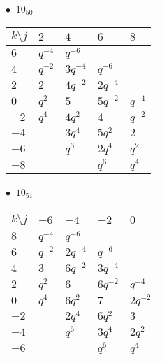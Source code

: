 \begin{minipage}{\linewidth}
$\bullet\ $ $10_{50}$ \vspace{0.5em} \\
\begin{tabular}{l|llll}
$k \setminus j$ & $2$ & $4$ & $6$ & $8$ \\
\hline
$6$ & $q^{-4}$ & $q^{-6}$ &  &  \\
$4$ & $q^{-2}$ & $3q^{-4}$ & $q^{-6}$ &  \\
$2$ & $2$ & $4q^{-2}$ & $2q^{-4}$ &  \\
$0$ & $q^{2}$ & $5$ & $5q^{-2}$ & $q^{-4}$ \\
$-2$ & $q^{4}$ & $4q^{2}$ & $4$ & $q^{-2}$ \\
$-4$ &  & $3q^{4}$ & $5q^{2}$ & $2$ \\
$-6$ &  & $q^{6}$ & $2q^{4}$ & $q^{2}$ \\
$-8$ &  &  & $q^{6}$ & $q^{4}$ \\
\end{tabular}
\vspace{2em}
\end{minipage}
%
\begin{minipage}{\linewidth}
$\bullet\ $ $10_{51}$ \vspace{0.5em} \\
\begin{tabular}{l|llll}
$k \setminus j$ & $-6$ & $-4$ & $-2$ & $0$ \\
\hline
$8$ & $q^{-4}$ & $q^{-6}$ &  &  \\
$6$ & $q^{-2}$ & $2q^{-4}$ & $q^{-6}$ &  \\
$4$ & $3$ & $6q^{-2}$ & $3q^{-4}$ &  \\
$2$ & $q^{2}$ & $6$ & $6q^{-2}$ & $q^{-4}$ \\
$0$ & $q^{4}$ & $6q^{2}$ & $7$ & $2q^{-2}$ \\
$-2$ &  & $2q^{4}$ & $6q^{2}$ & $3$ \\
$-4$ &  & $q^{6}$ & $3q^{4}$ & $2q^{2}$ \\
$-6$ &  &  & $q^{6}$ & $q^{4}$ \\
\end{tabular}
\vspace{2em}
\end{minipage}
%
